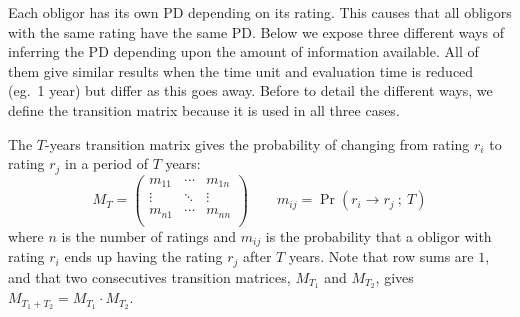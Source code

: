 \documentclass[11pt,fleqn]{book} %
\begin{document}
Each obligor has its own PD depending on its rating. This causes that 
all obligors with the same rating have the same PD\@. Below we expose 
three different ways of inferring the PD depending upon the amount of 
information available. All of them give similar results when the time 
unit and evaluation time is reduced (eg.\ 1 year) but differ as this 
goes away. Before to detail the different ways, we define the transition 
matrix because it is used in all three cases.

\begin{definition}
	\label{def:tm}
	The $T$-years transition matrix gives the probability of changing 
	from rating $r_i$ to rating $r_j$ in a period of $T$ years:
	\small
	\begin{displaymath}
		M_T = \left(
		\begin{array}{ccc}
			m_{11} & \cdots & m_{1n} \\
			\vdots & \ddots & \vdots \\
			m_{n1} & \cdots & m_{nn} \\
		\end{array}
		\right)
		\qquad
		m_{ij} = \Pr(r_i \to r_j\ ;\ T)
	\end{displaymath}
	where $n$ is the number of ratings and $m_{ij}$ is the probability that a
	obligor with rating $r_i$ ends up having the rating $r_j$ after $T$ years.
	Note that row sums are $1$, and that two consecutives transition matrices, 
	$M_{T_1}$ and $M_{T_2}$, gives $M_{T_1+T_2} = M_{T_1} \cdot M_{T_2}$.
\end{definition}
\end{document}

